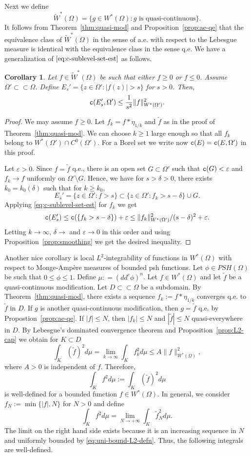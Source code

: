 \documentclass{amsart}
\newcommand{\wt}[1]{\widetilde{#1}}
\newcommand{\veps}{\varepsilon}
\newcommand{\de}{\delta}
\newcommand{\tc}{{\tt c}}
\newcommand{\Om}{\Omega}
\newtheorem{cor}[thm]{Corollary}
\theoremstyle{definition}
\numberwithin{thm}{section}
\numberwithin{equation}{section}
\renewcommand{\[}{\begin{equation}}
\renewcommand{\]}{\end{equation}}
\begin{document}
Next we define
\[ \label{eq:space-quasi-c} \wt W^*(\Om) = \{ g \in W^*(\Om): g \text{ is quasi-continuous}\}.
\]
It follows from Theorem~\ref{thm:quasi-mod} and Proposition~\ref{prop:ae-qe} that the equivalence class of $\wt W^*(\Om)$ in the sense of a.e. with respect to the Lebesgue measure is identical with the equivalence class in the sense q.e.  We have a generalization  of  $\eqref{eq:c-sublevel-set-est}$  as follows.

\begin{cor}\label{cor:cap-sublevel-gen}  Let $f \in \wt W^*(\Om)$ be such that either $f\geq 0$ or $f\leq 0$. Assume $\Om' \subset\subset \Om$. Define $E_s' = \{z\in \Om' : |f(z)|>s\}$ for $s>0$. Then,
$$
	\tc (E_s' , \Om') \leq \frac{1}{s^2} \|f\|_{W^*(\Om')}^2.
$$
\end{cor}

\begin{proof} We may assume $f\geq 0$. Let $f_k = f*\eta_{1/k}$ and $\wt f$ as in the proof of Theorem~\ref{thm:quasi-mod}. We can choose $k\geq 1$ large enough so that all $f_k$ belong to $W^*(\Om') \cap C^0(\Om')$. For a Borel set we write now $\tc (E) = \tc(E,\Om')$ in this proof.

Let $\veps>0$. Since $f = \wt f$ q.e., there is an open set $G \subset \Om'$ such that $\tc(G) <\veps$ and $f_k \to f$ uniformly on $\Om'\setminus G$. Hence, we have for $s>\de>0$, there exists $k_0 = k_0(\de)$ such that  for $k\geq k_0$,
$$E_s'= \{z\in\Om': f > s \} \subset \{z\in \Om': f_k > s -\de \} \cup G.$$ Applying \eqref{eq:c-sublevel-set-est} for $f_k$ we get
$$ \tc (E_s') \leq 
\tc (\{f_k >s-\de\}) + \veps  \leq \|f_k\|_{W^*(\Om')}^2 / (s - \de)^2 +\veps.
$$  Letting $k\to \infty$, $\de\to$ and $\veps\to 0$ in this order and using Proposition~\ref{prop:smoothing} we get the desired inequality.
\end{proof}

Another nice corollary is local $L^2$-integrability of functions in $W^*(\Om)$ with respect to Monge-Amp\`ere measures of bounded psh functions. 
Let $\phi \in PSH(\Om)$ be such that $0\leq \phi \leq 1$. 
Define $\mu: = (dd^c\phi)^n$.
Let $f \in W^*(\Om)$ and let $\wt f$ be a quasi-continuous modification. Let $D \subset \subset \Om$ be a subdomain. By Theorem~\ref{thm:quasi-mod},  there exists a sequence $f_k:=f* \eta_{1/k}$ converges q.e. to $\wt f$ in $D$. If $g$ is another quasi-continuous modification, then $g = \wt f$ q.e. by Propostion~\ref{prop:ae-qe}. If $|f| \leq N$, then $|f_k| \leq N$ and $|\wt f| \leq N$ quasi-everywhere in $D$. By Lebesgue's dominated convergence theorem and Proposition~\ref{prop:L2-cap} we obtain for $K\subset D$
\[\label{eq:uni-bound-L2-defn}	
	\int_K (\wt f)^2 d\mu = \lim_{k\to \infty} \int_K f_k^2 d\mu \leq A \|f\|_{W^*(\Om)}^2,
\]
where $A>0$ is independent of $f$. 
Therefore, 
\[
	\int_K f^2 d\mu := \int_K (\wt f)^2 d\mu 
\]
is well-defined for a bounded function $f \in W^*(\Om)$. 
In general, we consider $f_N := \min\{|f|, N\}$ for $N>0$ and define
$$
	\int_K f^2 d\mu = \lim_{N\to +\infty} \int_K \wt f^2_N d\mu.
$$
The limit on the right hand side exists because it is an increasing sequence in $N$ and uniformly bounded by \eqref{eq:uni-bound-L2-defn}. Thus, the following integrals are well-defined.
\end{document}
